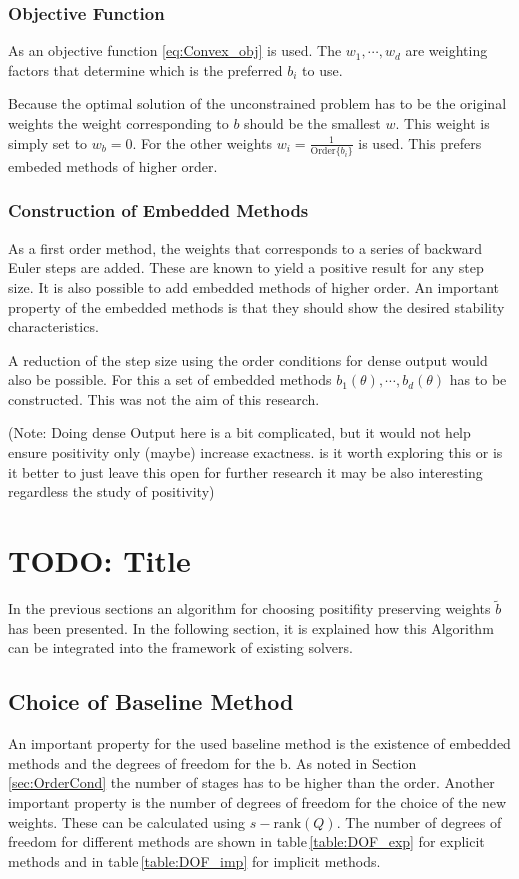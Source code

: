 \documentclass[a4paper]{scrartcl}
\numberwithin{equation}{section}
\theoremstyle{plain}
\theoremstyle{definition}
\numberwithin{theorem}{section}
\newcommand{\1}{\mathbbm{1}}
\begin{document}
\subsubsection{Objective Function}

As an objective function \eqref{eq:Convex_obj}
is used.  The $w_1,\cdots,w_d$ are weighting factors that determine which is the preferred $b_i$ to use.

Because the optimal solution of the unconstrained problem has to be the original weights the weight corresponding to $b$ should be the smallest $w$. This weight is simply set to $w_{b} = 0$. For the other weights $w_i = \frac{1}{\mathrm{Order} \{b_i\}}$ is used. This prefers embeded methods of higher order.

\subsubsection{Construction of Embedded Methods}

As a first order method, the weights that corresponds to a series of backward Euler steps are added. These are known to yield a positive result for any step size.
It is also possible to add embedded methods of higher order.
An important property of the embedded methods is that they should show the desired stability characteristics. 

A reduction of the step size using the order conditions for dense output would also be possible. For this a set of embedded methods $b_1(\theta),\cdots,b_d(\theta)$ has to be constructed. This was not the aim of this research.

(Note: Doing dense Output here is a bit complicated, but it would not help ensure positivity only (maybe) increase exactness.  is it worth exploring this or is it better to just leave this open for further research it may be also interesting regardless the study of positivity)
 
\section{TODO: Title} \label{sec:integration}

In the previous sections an algorithm for choosing positifity preserving weights $\tilde{b}$ has been presented. 
In the following section, it is explained how this Algorithm can be integrated into the framework of existing solvers.

\subsection{Choice of Baseline Method}
An important property for the used baseline method is the existence of embedded methods and the degrees of freedom for the b.
As noted in Section\,\ref{sec:OrderCond} the number of stages has to be higher than the order. 
Another important property is the number of degrees of freedom for the choice of the new weights. 
These can be calculated using $s-\mathrm{rank}(Q)$.%
The number of degrees of freedom for different methods are shown in table\,\ref{table:DOF_exp} for explicit methods and in table\,\ref{table:DOF_imp} for implicit methods.
\end{document}
